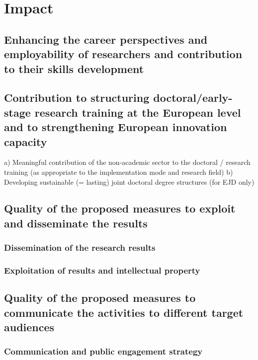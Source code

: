 \section{Impact}

\subsection{Enhancing the career perspectives and employability of researchers
  and contribution to their skills development}

\subsection{Contribution to structuring doctoral/early-stage research training at the European level and to strengthening European innovation capacity}

a) Meaningful contribution of the non-academic
  sector to the doctoral / research training (as appropriate to the
  implementation mode and research field)
b) Developing sustainable (= lasting)
  joint doctoral degree structures (for EJD only)

\subsection{Quality of the proposed measures to exploit and disseminate the
  results}
\subsubsection{Dissemination of the research results}
\subsubsection{Exploitation of results and intellectual property}

\subsection{Quality of the proposed measures to communicate the activities to
  different target audiences}
\subsubsection{Communication and public engagement strategy}



